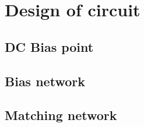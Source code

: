 \chapter{Design of circuit}
  
  \section{DC Bias point}

  \section{Bias network}

  \section{Matching network}
